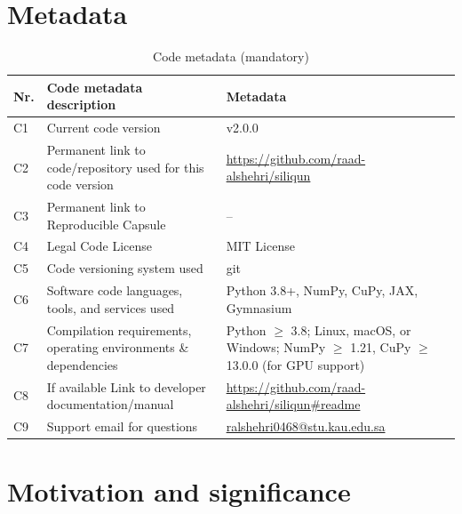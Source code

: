 \documentclass[preprint,12pt, a4paper]{elsarticle}
\begin{document}
\section*{Metadata}
\label{metadata}

\begin{table}[!h]
\begin{tabular}{|l|p{6.5cm}|p{6.5cm}|}
\hline
\textbf{Nr.} & \textbf{Code metadata description} & \textbf{Metadata} \\
\hline
C1 & Current code version & v2.0.0 \\
\hline
C2 & Permanent link to code/repository used for this code version & \url{https://github.com/raad-alshehri/siliqun} \\
\hline
C3  & Permanent link to Reproducible Capsule & -- \\
\hline
C4 & Legal Code License & MIT License \\
\hline
C5 & Code versioning system used & git \\
\hline
C6 & Software code languages, tools, and services used & Python 3.8+, NumPy, CuPy, JAX, Gymnasium \\
\hline
C7 & Compilation requirements, operating environments \& dependencies & Python $\geq$ 3.8; Linux, macOS, or Windows; NumPy $\geq$ 1.21, CuPy $\geq$ 13.0.0 (for GPU support) \\
\hline
C8 & If available Link to developer documentation/manual & \url{https://github.com/raad-alshehri/siliqun\#readme} \\
\hline
C9 & Support email for questions & \href{mailto:ralshehri0468@stu.kau.edu.sa}{ralshehri0468@stu.kau.edu.sa} \\
\hline
\end{tabular}
\caption{Code metadata (mandatory)}
\label{codeMetadata} 
\end{table}

\section{Motivation and significance}
\label{sec:motivation}
\end{document}

